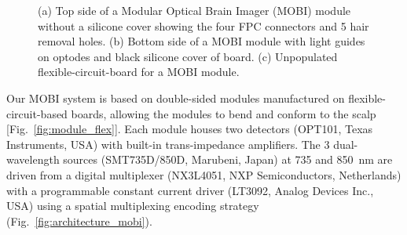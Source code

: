 \begin{figure}
\begin{minipage}{.35\textwidth}
\begin{center}
	    \end{center}  
    \end{minipage}%
	\caption{(a) Top side of a Modular Optical Brain Imager (MOBI) module without a silicone cover showing the four FPC connectors and 5 hair removal holes. (b) Bottom side of a MOBI module with light guides on optodes and black silicone cover of board. (c) Unpopulated flexible-circuit-board for a MOBI module.} 
	\label{fig:module}
\end{figure}

Our \ac{MOBI} system is based on double-sided modules manufactured on flexible-circuit-based boards, allowing the modules to bend and conform to the scalp [Fig.~\ref{fig:module_flex}]. Each module houses two detectors (OPT101, Texas Instruments, USA) with built-in trans-impedance amplifiers. The 3 dual-wavelength sources (SMT735D/850D, Marubeni, Japan) at 735 and 850~nm are driven from a digital multiplexer (NX3L4051, NXP Semiconductors, Netherlands) with a programmable constant current driver (LT3092, Analog Devices Inc., USA) using a spatial multiplexing encoding strategy (Fig.~\ref{fig:architecture_mobi}). 

